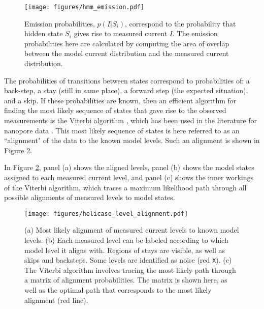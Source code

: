 \begin{figure}[h]
\begin{centering}
\texttt{[image: figures/hmm\_emission.pdf]}
\caption[Data analysis: hidden Markov model emission probability]{Emission probabilities, $p(I|S_i)$, correspond to the probability that hidden state $S_i$ gives rise to measured current $I$.  The emission probabilities here are calculated by computing the area of overlap between the model current distribution and the measured current distribution.}
\label{fig:data_analysis_emission}
\end{centering}
\end{figure}

The probabilities of transitions between states correspond to probabilities of: a back-step, a stay (still in same place), a forward step (the expected situation), and a skip.  If these probabilities are known, then an efficient algorithm for finding the most likely sequence of states that gave rise to the observed measurements is the Viterbi algorithm \citep{Viterbi1967, Forney1973}, which has been used in the literature for nanopore data \citep{Timp2012, Szalay2015}.  This most likely sequence of states is here referred to as an ``alignment" of the data to the known model levels.  Such an alignment is shown in Figure \ref{fig:data_analysis_alignment}.

In Figure \ref{fig:data_analysis_alignment}, panel (a) shows the aligned levels, panel (b) shows the model states assigned to each measured current level, and panel (c) shows the inner workings of the Viterbi algorithm, which traces a maximum likelihood path through all possible alignments of measured levels to model states.

\begin{figure}[H]
\begin{centering}
\texttt{[image: figures/helicase\_level\_alignment.pdf]}
\caption[Data analysis: Viterbi level alignment to model]{(a) Most likely alignment of measured current levels to known model levels.  (b) Each measured level can be labeled according to which model level it aligns with.  Regions of stays are visible, as well as skips and backsteps.  Some levels are identified as noise (red \texttt{X}).  (c) The Viterbi algorithm involves tracing the most likely path through a matrix of alignment probabilities.  The matrix is shown here, as well as the optimal path that corresponds to the most likely alignment (red line).}
\label{fig:data_analysis_alignment}
\end{centering}
\end{figure}

